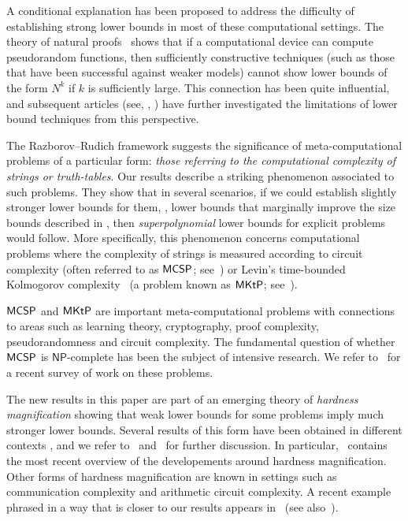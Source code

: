 \documentclass{toc}
\newcommand{\MCSP}{\ensuremath{{\sf MCSP}}\xspace}
\newcommand{\MKtP}{\ensuremath{{\sf MKtP}}\xspace}
\begin{document}
A conditional explanation has been proposed to address the difficulty of establishing strong lower bounds in most of these computational settings. The theory of natural proofs~\cite{DBLP:journals/jcss/RazborovR97} shows that if a computational device can compute pseudorandom functions, then sufficiently constructive techniques (such as those that have been successful against weaker models) cannot show lower bounds of the form $N^k$ if $k$ is sufficiently large. This connection has been quite influential, and subsequent
%
articles   %
(see, \eg, \cite{DBLP:journals/jacm/MilesV15, Bogdanov18}) have 
further investigated the limitations of lower bound techniques from this 
perspective.  %

The Razborov--Rudich framework suggests the significance of meta-computational problems of a particular form: \emph{those referring to the computational complexity of strings or truth-tables}. Our results describe a striking phenomenon associated to such problems. They show that in several scenarios, if we could establish slightly stronger lower bounds for them, \ie, lower bounds that marginally improve the size bounds described in , then \emph{superpolynomial} lower bounds for explicit problems would follow. More specifically, this phenomenon concerns computational problems where the complexity of
strings %
is    %
measured according to circuit complexity (often referred to as \MCSP; see~\cite{DBLP:conf/stoc/KabanetsC00}) or Levin's time-bounded Kolmogorov complexity~\cite{Levin84} (a problem known as \MKtP; see~\cite{DBLP:journals/siamcomp/AllenderBKMR06}). 

\MCSP and \MKtP are important meta-computational problems with connections to areas such as learning theory, cryptography, proof complexity, pseudorandomness and circuit complexity. The fundamental question of whether \MCSP is $\mathsf{NP}$-complete has been the subject of  intensive research. We refer to~\cite{Allender20} for a %
recent survey of work on these problems.

The new results in this paper are part of an emerging theory of \emph{hardness magnification} showing that weak lower bounds for some problems imply much stronger lower bounds. Several results of this form have been obtained in different contexts \cite{DBLP:journals/jcss/Srinivasan03, DBLP:journals/jacm/AllenderK10, DBLP:journals/cc/LiptonW13, DBLP:journals/eccc/MullerP17, OS18}, and we refer to~\cite{OS18} and~\cite{chen_et_al:LIPIcs:2020:11755} for further discussion. In particular,~\cite{chen_et_al:LIPIcs:2020:11755} contains the most recent overview of the developements around hardness magnification. Other forms of hardness magnification are known in settings such as communication complexity and arithmetic circuit complexity. A recent example phrased in a way that is closer to our results appears in~\cite{CILM18} (see also~\cite{hrubevs2011non}).
\end{document}
